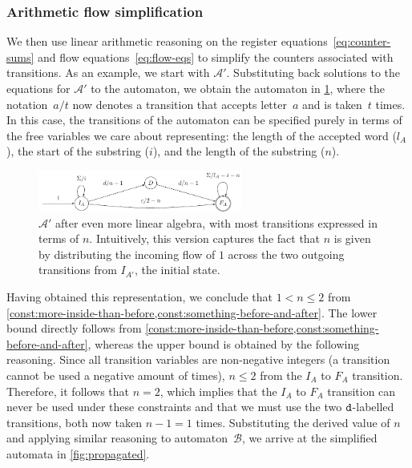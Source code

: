 \subsubsection{Arithmetic flow simplification}\label{sec:intuition:algebra}

We then use linear arithmetic reasoning on the register
equations~\eqref{eq:counter-sums} and flow
equations~\eqref{eq:flow-eqs} to simplify the counters associated
with transitions.
As an example, we start with $\mathcal{A}'$. Substituting back
solutions to the equations for $\mathcal{A}'$ to the automaton, we obtain the
automaton in \cref{fig:a_2}, where the notation~$a / t$ now denotes
a transition that accepts letter~$a$ and is taken~$t$ times.
In this case, the transitions of the automaton
can be specified purely in terms of the free
variables we care about representing:  the length of the accepted word ($l_A$), the
start of the substring ($i$), and the length of the substring ($n$).

\begin{figure}[tb]
  \centering 
  \includegraphics[width=0.6\textwidth]{a_2}
  \caption{ $\mathcal{A}'$ after even more linear algebra, with most transitions expressed
  in terms of $n$. Intuitively, this version captures the fact that $n$ is given
  by distributing the incoming flow of $1$ across the two outgoing transitions
  from $I_{A'}$, the initial state.}
  \label{fig:a_2}
\end{figure}

Having obtained this representation, we conclude that $1 < n \leq 2$
from
\cref{const:more-inside-than-before,const:something-before-and-after}. The
lower bound directly follows from
\cref{const:more-inside-than-before,const:something-before-and-after},
whereas the upper bound is obtained by the following reasoning. Since all
transition variables are non-negative integers (a transition cannot be
used a negative amount of times), $n \leq 2$ from the $I_A$ to $F_A$
transition. Therefore, it follows that $n=2$, which implies that the
$I_A$ to $F_A$ transition can never be used under these constraints
and that we must use the two $\texttt{d}$-labelled transitions, both now
taken $n-1 =1$ times.
%
Substituting the derived value of $n$ and applying similar
reasoning to automaton~$\mathcal{B}$, we arrive at the simplified
automata in \cref{fig:propagated}.

